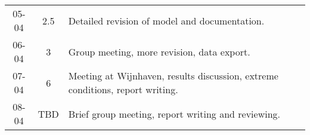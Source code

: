 \begin{longtable}[c]{c|c|m{35em}}
05-04   &   2.5     &   Detailed revision of model and documentation.                                \\
06-04   &   3       &   Group meeting, more revision, data export.                                   \\
07-04   &   6       &   Meeting at Wijnhaven, results discussion, extreme conditions, report writing.\\
08-04   &   TBD     &   Brief group meeting, report writing and reviewing.                           \\



\end{longtable}

